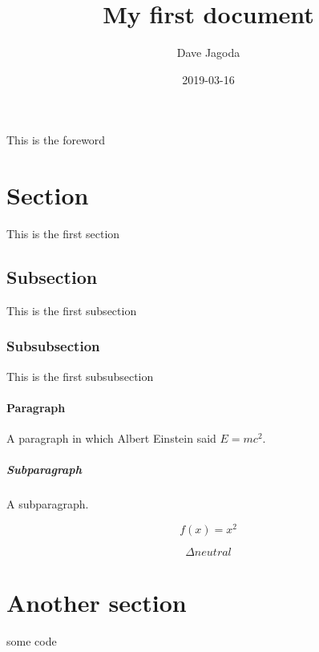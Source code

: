 \documentclass[letterpaper]{article}
\title{My first document}
\author{Dave Jagoda}
\date{2019-03-16}
\begin{document}
\maketitle
{}

\newpage
{}
This is the foreword

\newpage
{}

\section{Section}

This is the first section

\subsection{Subsection}

This is the first subsection

\subsubsection{Subsubsection}

This is the first subsubsection

\paragraph{Paragraph}

A paragraph in which Albert Einstein said $E = mc^2$.

\subparagraph{Subparagraph}

A subparagraph.

\begin{equation*}
  f(x) = x^2
\end{equation*}

\begin{equation*}
  \Delta neutral
\end{equation*}

\section{Another section}

some code


\end{document}
